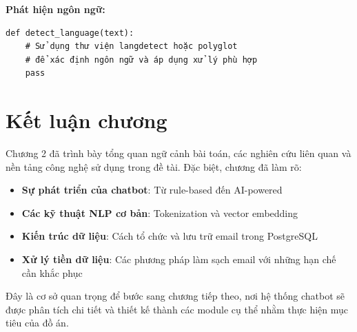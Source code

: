 \documentclass[../DoAn.tex]{subfiles}
\begin{document}
\textbf{Phát hiện ngôn ngữ:}
\begin{verbatim}
def detect_language(text):
    # Sử dụng thư viện langdetect hoặc polyglot
    # để xác định ngôn ngữ và áp dụng xử lý phù hợp
    pass
\end{verbatim}

\section{Kết luận chương}
Chương 2 đã trình bày tổng quan ngữ cảnh bài toán, các nghiên cứu liên quan và nền tảng công nghệ sử dụng trong đề tài. Đặc biệt, chương đã làm rõ:
\begin{itemize}
    \item \textbf{Sự phát triển của chatbot}: Từ rule-based đến AI-powered
    \item \textbf{Các kỹ thuật NLP cơ bản}: Tokenization và vector embedding
    \item \textbf{Kiến trúc dữ liệu}: Cách tổ chức và lưu trữ email trong PostgreSQL
    \item \textbf{Xử lý tiền dữ liệu}: Các phương pháp làm sạch email với những hạn chế cần khắc phục
\end{itemize}

Đây là cơ sở quan trọng để bước sang chương tiếp theo, nơi hệ thống chatbot sẽ được phân tích chi tiết và thiết kế thành các module cụ thể nhằm thực hiện mục tiêu của đồ án.
\end{document}
